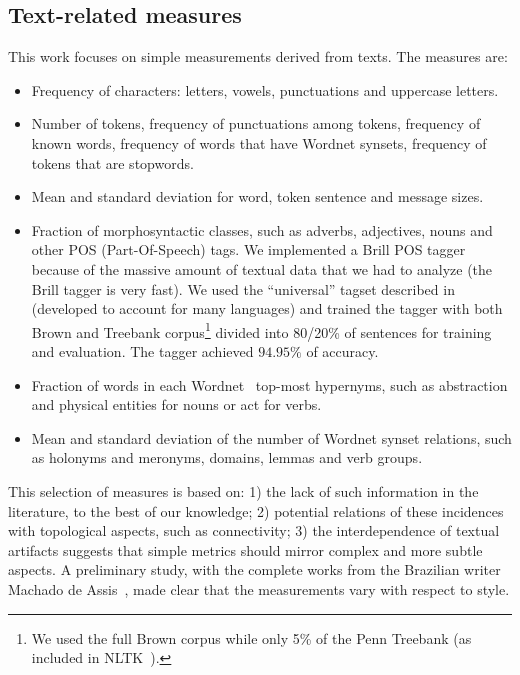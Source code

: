\documentclass[review]{elsarticle}
\begin{document}
\subsection{Text-related measures}
This work focuses on simple measurements derived from texts.
The measures are:
\begin{itemize}
\item Frequency of characters: letters, vowels, punctuations and uppercase letters.
\item Number of tokens, frequency of punctuations among tokens, frequency of known words, frequency of words that have Wordnet synsets, frequency of tokens that are stopwords.
\item Mean and standard deviation for word, token sentence and message sizes.
\item Fraction of morphosyntactic classes, such as adverbs, adjectives, nouns and other POS (Part-Of-Speech) tags.
	We implemented a Brill POS tagger because of the massive amount of textual data that we had to analyze (the Brill tagger is very fast).
	We used the ``universal'' tagset described in~\cite{petrov} (developed to account for many languages) and trained the tagger with both Brown and Treebank corpus\footnote{We
		used the full Brown corpus while only 5\% of the Penn Treebank (as included in NLTK~\cite{trabNLTK}).}
	divided into 80/20\% of sentences for training and evaluation. The tagger achieved $94.95\%$ of accuracy.
\item Fraction of words in each Wordnet~\cite{wordnet} top-most hypernyms,
such as abstraction and physical entities for nouns or act for verbs.
\item Mean and standard deviation of the number of Wordnet synset relations, such as holonyms and meronyms, domains, lemmas and verb groups.
\end{itemize}

This selection of measures is based on: 1) the lack of such information in the literature, to the best of our knowledge; 
2) potential relations of these incidences with topological aspects, such as connectivity;
3) the interdependence of textual artifacts suggests that simple metrics should mirror complex and more subtle aspects.
A preliminary study, with the complete works from the Brazilian writer Machado de Assis~\cite{machado},
made clear that the measurements vary with respect to style.
\end{document}
